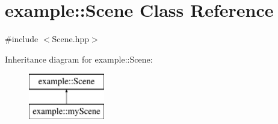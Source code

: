 \hypertarget{classexample_1_1_scene}{}\section{example\+:\+:Scene Class Reference}
\label{classexample_1_1_scene}


{\ttfamily \#include $<$Scene.\+hpp$>$}

Inheritance diagram for example\+:\+:Scene\+:\begin{figure}[H]
\begin{center}
\leavevmode
\includegraphics[height=2.000000cm]{classexample_1_1_scene}
\end{center}
\end{figure}

